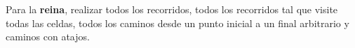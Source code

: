 Para la \textbf{reina}, realizar todos los recorridos, todos los recorridos tal que visite todas las celdas, todos los caminos desde un punto inicial a un final arbitrario y caminos con atajos.